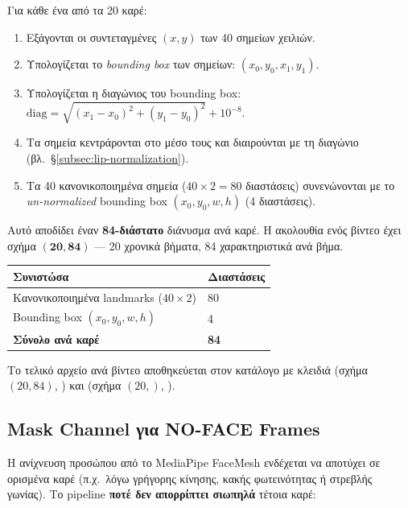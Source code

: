 Για κάθε ένα από τα 20 καρέ:
\begin{enumerate}
  \item Εξάγονται οι συντεταγμένες $(x, y)$ των 40 σημείων χειλιών.
  \item Υπολογίζεται το \emph{bounding box} των σημείων:
    $(x_0, y_0, x_1, y_1)$.
  \item Υπολογίζεται η διαγώνιος του bounding box:
    $\mathrm{diag} = \sqrt{(x_1-x_0)^2 + (y_1-y_0)^2} + 10^{-8}$.
  \item Τα σημεία κεντράρονται στο μέσο τους και διαιρούνται με τη
    διαγώνιο (βλ.\ §\ref{subsec:lip-normalization}).
  \item Τα 40 κανονικοποιημένα σημεία ($40 \times 2 = 80$ διαστάσεις)
    συνενώνονται με το \emph{un-normalized} bounding box
    $(x_0, y_0, w, h)$ (4 διαστάσεις).
\end{enumerate}

Αυτό αποδίδει έναν \textbf{84-διάστατο} διάνυσμα ανά καρέ.
Η ακολουθία ενός βίντεο έχει σχήμα $\mathbf{(20, 84)}$ —
20 χρονικά βήματα, 84 χαρακτηριστικά ανά βήμα.

\begin{center}
\begin{tabular}{ll}
  \toprule
  Συνιστώσα & Διαστάσεις \\
  \midrule
  Κανονικοποιημένα landmarks ($40 \times 2$) & 80 \\
  Bounding box $(x_0, y_0, w, h)$            &  4 \\
  \midrule
  \textbf{Σύνολο ανά καρέ}                   & \textbf{84} \\
  \bottomrule
\end{tabular}
\end{center}

Το τελικό  αρχείο ανά βίντεο αποθηκεύεται στον κατάλογο
 με κλειδιά  (σχήμα $(20, 84)$,
) και  (σχήμα $(20,)$, ).

\subsection{Mask Channel για NO-FACE Frames}
\label{subsec:lip-mask}

Η ανίχνευση προσώπου από το MediaPipe FaceMesh ενδέχεται να αποτύχει σε
ορισμένα καρέ (π.χ.\ λόγω γρήγορης κίνησης, κακής φωτεινότητας ή στρεβλής
γωνίας).
Το pipeline \textbf{ποτέ δεν απορρίπτει σιωπηλά} τέτοια καρέ:

